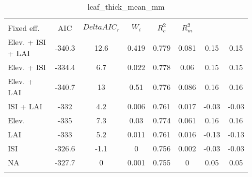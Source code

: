 
\begin{table}[!htbp] \centering 
  \caption{leaf_thick_mean_mm} 
  \label{leaf_thick_mean_mm} 
\begin{tabular}{@{\extracolsep{5pt}} lS[table-format=3.2]S[table-format=3.2]S[table-format=3.2]S[table-format=3.2]S[table-format=3.2]S[table-format=3.2]S[table-format=3.2]} 
\\[-1.8ex]\hline 
\hline \\[-1.8ex] 
{Fixed eff.} & {AIC} & {$Delta{}AIC_r$} & {$W_i$} & {$R^2_c$} & {$R^2_m$} %
\hline \\[-1.8ex] 
Elev. + ISI + LAI & -340.3 & 12.6 & 0.419 & 0.779 & 0.081 & 0.15 & 0.15 \\ 
Elev. + ISI & -334.4 & 6.7 & 0.022 & 0.778 & 0.06 & 0.15 & 0.15 \\ 
Elev. + LAI & -340.7 & 13 & 0.51 & 0.776 & 0.086 & 0.16 & 0.16 \\ 
ISI + LAI & -332 & 4.2 & 0.006 & 0.761 & 0.017 & -0.03 & -0.03 \\ 
Elev. & -335 & 7.3 & 0.03 & 0.774 & 0.061 & 0.16 & 0.16 \\ 
LAI & -333 & 5.2 & 0.011 & 0.761 & 0.016 & -0.13 & -0.13 \\ 
ISI & -326.6 & -1.1 & 0 & 0.756 & 0.002 & -0.03 & -0.03 \\ 
NA & -327.7 & 0 & 0.001 & 0.755 & 0 & 0.05 & 0.05 \\ 
\hline \\[-1.8ex] 
\end{tabular} 
\end{table} 
